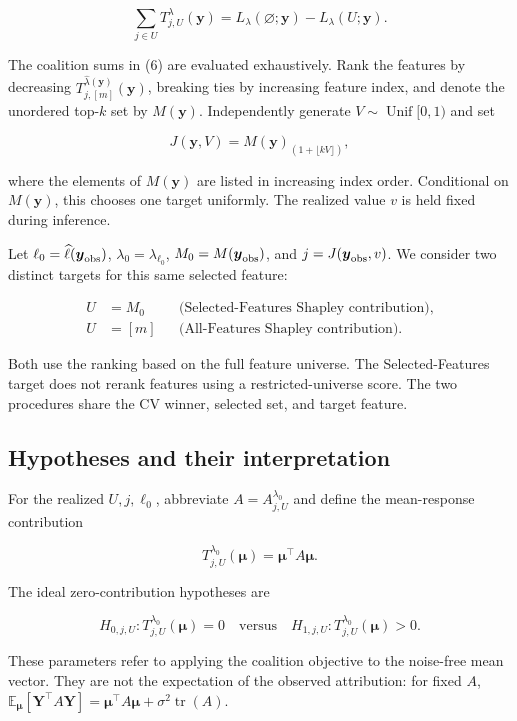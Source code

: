 \documentclass[
  11pt,
]{article}
\begin{document}
\[
\sum_{j\in U}T_{j,U}^\lambda(\boldsymbol y)
=L_\lambda(\varnothing;\boldsymbol y)-L_\lambda(U;\boldsymbol y).
\tag{7}
\]

The coalition sums in (6) are evaluated exhaustively. Rank the features
by decreasing
\(T_{j,[m]}^{\widehat\lambda(\boldsymbol y)}(\boldsymbol y)\), breaking
ties by increasing feature index, and denote the unordered top-\(k\) set
by \(M(\boldsymbol y)\). Independently generate
\(V\sim\operatorname{Unif}[0,1)\) and set

\[
J(\boldsymbol y,V)=M(\boldsymbol y)_{(1+\lfloor kV\rfloor)},
\tag{8}
\]

where the elements of \(M(\boldsymbol y)\) are listed in increasing
index order. Conditional on \(M(\boldsymbol y)\), this chooses one
target uniformly. The realized value \(v\) is held fixed during
inference.

Let \(\ell_0=\widehat\ell(\boldsymbol y_{\rm obs})\),
\(\lambda_0=\lambda_{\ell_0}\), \(M_0=M(\boldsymbol y_{\rm obs})\), and
\(j=J(\boldsymbol y_{\rm obs},v)\). We consider two distinct targets for
this same selected feature:

\[
\begin{aligned}
U&=M_0 &&\text{(Selected-Features Shapley contribution)},\\
U&=[m] &&\text{(All-Features Shapley contribution)}.
\end{aligned}
\tag{9}
\]

Both use the ranking based on the full feature universe. The
Selected-Features target does not rerank features using a
restricted-universe score. The two procedures share the CV winner,
selected set, and target feature.

\subsection{Hypotheses and their
interpretation}\label{hypotheses-and-their-interpretation}

For the realized \(U,j,\ell_0\), abbreviate \(A=A_{j,U}^{\lambda_0}\)
and define the mean-response contribution

\[
T_{j,U}^{\lambda_0}(\boldsymbol\mu)=\boldsymbol\mu^\top A\boldsymbol\mu.
\]

The ideal zero-contribution hypotheses are

\[
H_{0,j,U}:T_{j,U}^{\lambda_0}(\boldsymbol\mu)=0
\quad\text{versus}\quad
H_{1,j,U}:T_{j,U}^{\lambda_0}(\boldsymbol\mu)>0.
\tag{10}
\]

These parameters refer to applying the coalition objective to the
noise-free mean vector. They are not the expectation of the observed
attribution: for fixed \(A\),
\(\mathbb E_{\boldsymbol\mu}[\boldsymbol Y^\top A\boldsymbol Y]=\boldsymbol\mu^\top A\boldsymbol\mu+\sigma^2\operatorname{tr}(A)\).
\end{document}
